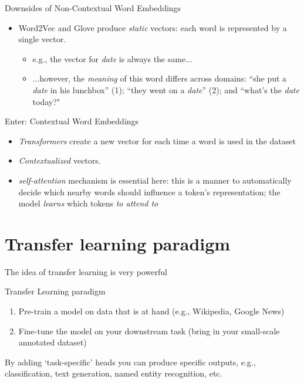 \documentclass[compress]{beamer}
\begin{document}
\begin{frame}
\begin{alertblock}{Downsides of Non-Contextual Word Embeddings}
	\begin{itemize}
		\item Word2Vec and Glove produce \emph{static} vectors: each word is represented by a single vector.
		\begin{itemize}	
\item e.g., the vector for \emph{date} is always the same...
\item ...however, the \emph{meaning} of this word differs across domains: ``she put a \emph{date} in his lunchbox'' (1); ``they went on a \emph{date}'' (2); and ``what's the \emph{date} today?"
		\end{itemize}
	\end{itemize}
\end{alertblock}
\begin{exampleblock}{Enter: Contextual Word Embeddings}
	\begin{itemize}
		\item \emph{Transformers} create a new vector for each time a word is used in the dataset
		\item \emph{Contextualized} vectors.
		\item \textit{self-attention} mechanism is essential here: this is a manner to automatically decide which nearby words should influence a token's representation; the model  \textit{learns} which tokens \emph{to attend to} 
	\end{itemize}
\end{exampleblock}
\end{frame}

\section{Transfer learning paradigm}

\begin{frame}{The idea of transfer learning is very powerful}
	\begin{block}{Transfer Learning paradigm}
		\begin{enumerate}
			\item \alert{Pre-train} a model on data that is at hand (e.g., Wikipedia, Google News)
			\item \alert{Fine-tune} the model on your downstream task (bring in your small-scale annotated dataset)
		\end{enumerate}
	By adding `task-specific' heads you can produce specific outputs, e.g., classification, text generation, named entity recognition, etc. 
	\end{block}
\end{frame}
	
\end{document}
